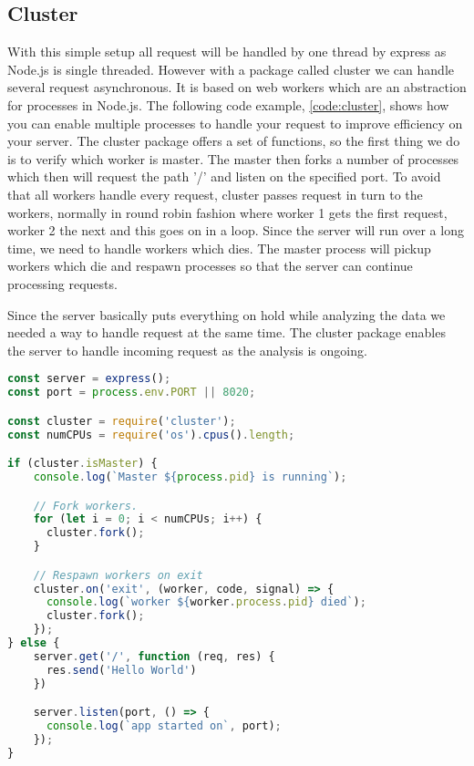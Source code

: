 \documentclass[USenglish]{ifimaster}  %
\begin{document}
\subsection{Cluster}
With this simple setup all request will be handled by one thread by express as Node.js is single threaded. However with a package called cluster we can handle several request asynchronous. It is based on web workers which are an abstraction for processes in Node.js.
The following code example, \vref{code:cluster}, shows how you can enable multiple processes to handle your request to improve efficiency on your server. The cluster package offers a set of functions, so the first thing we do is to verify which worker is master. The master then forks a number of processes which then will request the path '/' and listen on the specified port. To avoid that all workers handle every request, cluster passes request in turn to the workers, normally in round robin fashion where worker 1 gets the first request, worker 2 the next and this goes on in a loop. Since the server will run over a long time, we need to handle workers which dies. The master process will pickup workers which die and respawn processes so that the server can continue processing requests.

Since the server basically puts everything on hold while analyzing the data we needed a way to handle request at the same time. The cluster package enables the server to handle incoming request as the analysis is ongoing.

\begin{lstlisting}[caption={Express setup with cluster},label={code:cluster},language=JavaScript]
const server = express();
const port = process.env.PORT || 8020;

const cluster = require('cluster');
const numCPUs = require('os').cpus().length;

if (cluster.isMaster) {
    console.log(`Master ${process.pid} is running`);

    // Fork workers.
    for (let i = 0; i < numCPUs; i++) {
      cluster.fork();
    }

    // Respawn workers on exit
    cluster.on('exit', (worker, code, signal) => {
      console.log(`worker ${worker.process.pid} died`);
      cluster.fork();
    });
} else {
    server.get('/', function (req, res) {
      res.send('Hello World')
    })

    server.listen(port, () => {
      console.log(`app started on`, port);
    });
}
\end{lstlisting}
\end{document}
